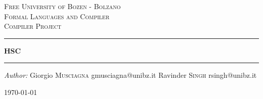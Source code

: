 \documentclass[12pt]{article}
\begin{document}
\begin{titlepage}
\center




\textsc{\LARGE Free University of Bozen - Bolzano}\\[1.5cm]
\textsc{\Large Formal Languages and Compiler}\\[0.5cm]
\textsc{\large Compiler Project}\\[0.5cm]




\vspace{2.5cm}
\hrule
\vspace{1cm}
{\huge \bfseries HSC}
\vspace{1cm}
\hrule
\vspace{3.5cm}




\begin{minipage}{0.95\textwidth}
\begin{flushleft} \large
\emph{Author:}
\newline
\newline
Giorgio \textsc{Musciagna} \hfill gmusciagna@unibz.it
\newline
Ravinder \textsc{Singh} \hfill rsingh@unibz.it
\end{flushleft}
\end{minipage}




\vfill
{\large \today}




\end{titlepage}




\end{document}
